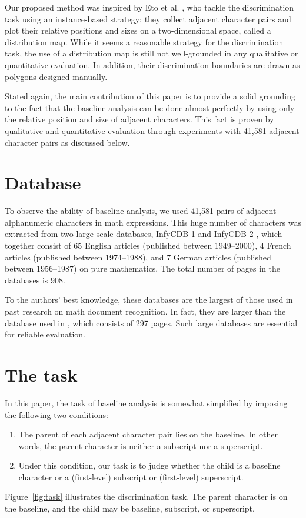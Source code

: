 \documentclass[10pt]{article}
\begin{document}
Our proposed method was inspired by Eto et al. \cite{Eto2001}, who tackle the discrimination task using an instance-based strategy; they collect adjacent character pairs and plot their relative positions and sizes on a two-dimensional space, called a distribution map. While it seems a reasonable strategy for the discrimination task, the use of a distribution map is still not well-grounded in any qualitative or quantitative evaluation. In addition, their discrimination boundaries are drawn as polygons designed manually.

Stated again, the main contribution of this paper is to provide a solid grounding to the fact that the baseline analysis can be done almost perfectly by using only the relative position and size of adjacent characters. This fact is proven by qualitative and quantitative evaluation through experiments with 41,581 adjacent character pairs as discussed below.

\section{Database}
\label{sec:database}
To observe the ability of baseline analysis, we used 41,581 pairs of adjacent alphanumeric characters in math expressions. This huge number of characters was extracted from two large-scale databases, InfyCDB-1 \cite{Suzuki2005, Uchida2005} and InfyCDB-2 \cite{Suzuki2007}, which together consist of 65 English articles (published between 1949--2000), 4 French articles (published between 1974--1988), and 7 German articles (published between 1956--1987) on pure mathematics. The total number of pages in the databases is 908.

To the authors' best knowledge, these databases are the largest of those used in past research on math document recognition. In fact, they are larger than the database used in \cite{Garain2005}, which consists of 297 pages. Such large databases are essential for reliable evaluation.

\section{The task}
\label{sec:task}
In this paper, the task of baseline analysis is somewhat simplified by imposing the following two conditions:
\begin{enumerate}
\item The parent of each adjacent character pair lies on the baseline. In other words, the parent character is neither a subscript nor a superscript.
\item Under this condition, our task is to judge whether the child is a baseline character or a (first-level) subscript or (first-level) superscript.
\end{enumerate}
Figure~\ref{fig:task} illustrates the discrimination task. The parent character is on the baseline, and the child may be baseline, subscript, or superscript.
\end{document}

